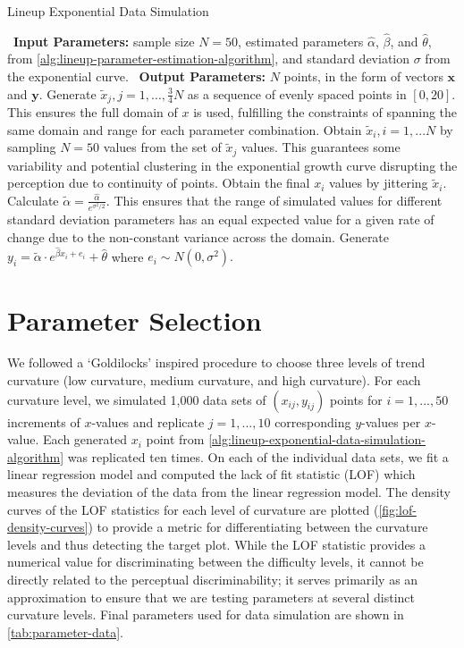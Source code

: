 \documentclass[12pt]{article}
\begin{document}
\begin{algorithm}
  \caption{Lineup Exponential Data Simulation}\label{alg:lineup-exponential-data-simulation-algorithm}
  \begin{algorithmic}[1]
    \Statex \textbullet~\textbf{Input Parameters:} sample size $N = 50$, estimated parameters $\hat\alpha$, $\hat\beta$, and $\hat\theta$, from \cref{alg:lineup-parameter-estimation-algorithm}, and standard deviation $\sigma$ from the exponential curve.
    \Statex \textbullet~\textbf{Output Parameters:} $N$ points, in the form of vectors $\mathbf{x}$ and $\mathbf{y}$.
    \State Generate $\tilde x_j, j = 1,..., \frac{3}{4}N$ as a sequence of evenly spaced points in $[0,20]$. This ensures the full domain of $x$ is used, fulfilling the constraints of spanning the same domain and range for each parameter combination.
    \State Obtain $\tilde x_i, i = 1,...N$ by sampling $N = 50$ values from the set of $\tilde x_j$ values. This guarantees some variability and potential clustering in the exponential growth curve disrupting the perception due to continuity of points.
    \State Obtain the final $x_i$ values by jittering $\tilde x_i$.
    \State Calculate $\tilde\alpha = \frac{\hat\alpha}{e^{\sigma^2/2}}.$ This ensures that the range of simulated values for different standard deviation parameters has an equal expected value for a given rate of change due to the non-constant variance across the domain.
    \State Generate $y_i = \tilde\alpha\cdot e^{\hat\beta x_i + e_i}+\hat\theta$ where $e_i\sim N(0,\sigma^2).$
  \end{algorithmic}
\end{algorithm}

\hypertarget{lineups-parameter-selection}{%
\section{Parameter Selection}\label{lineups-parameter-selection}}

We followed a `Goldilocks' inspired procedure to choose three levels of
trend curvature (low curvature, medium curvature, and high curvature).
For each curvature level, we simulated 1,000 data sets of
\((x_{ij}, y_{ij})\) points for \(i = 1,...,50\) increments of
\(x\)-values and replicate \(j = 1,...,10\) corresponding \(y\)-values
per \(x\)-value. Each generated \(x_i\) point from
\cref{alg:lineup-exponential-data-simulation-algorithm} was replicated
ten times. On each of the individual data sets, we fit a linear
regression model and computed the lack of fit statistic (LOF) which
measures the deviation of the data from the linear regression model. The
density curves of the LOF statistics for each level of curvature are
plotted (\cref{fig:lof-density-curves}) to provide a metric for
differentiating between the curvature levels and thus detecting the
target plot. While the LOF statistic provides a numerical value for
discriminating between the difficulty levels, it cannot be directly
related to the perceptual discriminability; it serves primarily as an
approximation to ensure that we are testing parameters at several
distinct curvature levels. Final parameters used for data simulation are
shown in \cref{tab:parameter-data}.
\end{document}
